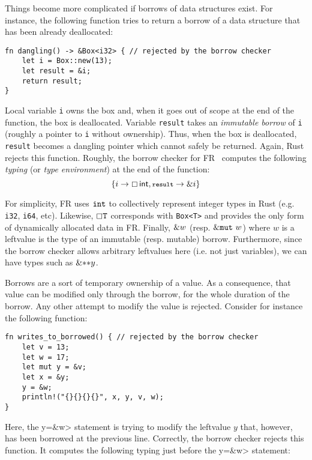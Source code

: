 Things become more complicated if borrows of data structures exist.
For instance, the following function tries to return a borrow of
a data structure that has been already deallocated:

\begin{lstlisting}
fn dangling() -> &Box<i32> { // rejected by the borrow checker
    let i = Box::new(13);
    let result = &i;
    return result;
}
\end{lstlisting}

\noindent

Local variable \lstinline{i} owns the box and, when it goes out of
scope at the end of the function, the box is deallocated.  Variable
\lstinline{result} takes an {\em immutable borrow} of \lstinline{i}
(roughly a pointer to \lstinline{i} without ownership).  Thus, when
the box is deallocated, \lstinline{result} becomes a dangling pointer
which cannot safely be returned.  Again, Rust rejects this function.
Roughly, the borrow checker for FR~\cite{Pea21} computes the following
\emph{typing} (or \emph{type environment}) at the end of the function:
\[
\{i\to\boxtype{\mathsf{int},\<result>\to\borrow i}\}
\]

For simplicity, FR uses ${\tt int}$ to collectively represent integer
types in Rust (e.g. \lstinline{i32}, \lstinline{i64}, etc).  Likewise,
$\boxempty{\tt T}$ corresponds with \lstinline{Box<T>} and provides
the only form of dynamically allocated data in FR.  Finally, $\&
w$ (resp. $\&\mathtt{mut}\  w$) where $w$ is a leftvalue is the type of an
immutable (resp. mutable) borrow.  Furthermore, since the borrow
checker allows arbitrary leftvalues here (i.e. not just variables), we
can have types such as $\&\mathtt{**}y$.

Borrows are a sort of temporary ownership of a value. As a consequence,
that value can be modified only through the borrow, for the whole
duration of the borrow. Any other attempt to modify the value is rejected.
Consider for instance the following function:

\begin{lstlisting}
fn writes_to_borrowed() { // rejected by the borrow checker
    let v = 13;
    let w = 17;
    let mut y = &v;
    let x = &y;
    y = &w;
    println!("{}{}{}{}", x, y, v, w);
}
\end{lstlisting}

\noindent
Here, the \<y=\&w> statement is trying to modify the leftvalue $y$
that, however, has been borrowed at the previous line. Correctly, the borrow
checker rejects this function. It computes the following typing
just before the \<y=\&w> statement:

